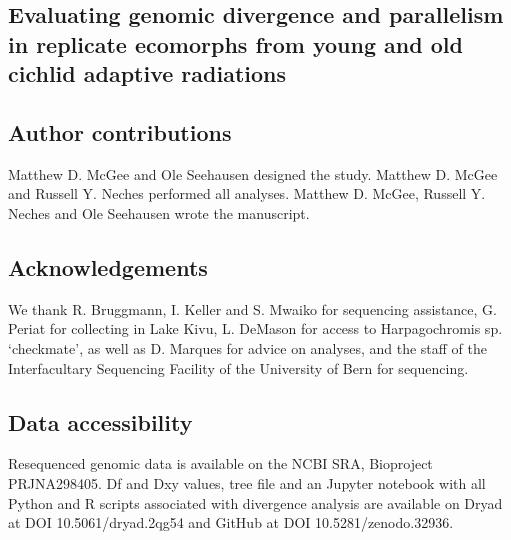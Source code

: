 \begin{refsection}

\chapter{Evaluating genomic divergence and parallelism in replicate ecomorphs from young and old cichlid adaptive radiations}


\section{Author contributions}

Matthew D. McGee and Ole Seehausen designed the study. Matthew D. McGee and Russell Y. Neches performed all analyses. Matthew D. McGee, Russell Y. Neches and Ole Seehausen wrote the manuscript.








\section{Acknowledgements}

We thank R. Bruggmann, I. Keller and S. Mwaiko for sequencing assistance, G. Periat for collecting in Lake Kivu, L. DeMason for access to Harpagochromis sp. ‘checkmate’, as well as D. Marques for advice on analyses, and the staff of the Interfacultary Sequencing Facility of the University of Bern for sequencing.

\section{Data accessibility}

Resequenced genomic data is available on the NCBI SRA, Bioproject PRJNA298405. Df and Dxy values, tree file and an Jupyter notebook with all Python and R scripts associated with divergence analysis are available on Dryad at DOI 10.5061/dryad.2qg54 and GitHub at DOI 10.5281/zenodo.32936.

\printbibliography[heading=subbibliography]

\end{refsection}